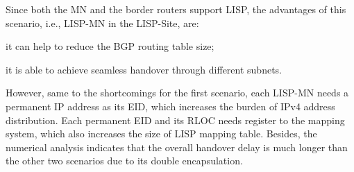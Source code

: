 {Since both the MN and the border routers support LISP, the advantages of this scenario, i.e., LISP-MN in the LISP-Site, are: 
\begin{inparaenum}[1)]
	\item it can help to reduce the BGP routing table size;
	\item it is able to achieve seamless handover through different subnets.
\end{inparaenum}
However, same to the shortcomings for the first scenario, each LISP-MN needs a permanent IP address as its EID, which increases the burden of IPv4 address distribution. Each permanent EID and its RLOC needs register to the mapping system, which also increases the size of LISP mapping table. Besides, the numerical analysis indicates that the overall handover delay is much longer than the other two scenarios due to its double encapsulation.


%
%

}
